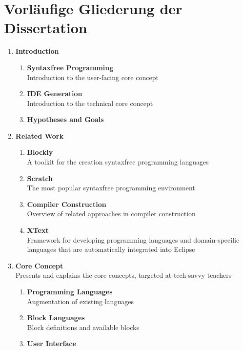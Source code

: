 \documentclass[paper=a4,fontsize=11pt,parskip=half]{scrartcl}
\begin{document}
\newpage

\section{Vorläufige Gliederung der Dissertation}

\begin{enumerate}[noitemsep]
\item \textbf{Introduction}
  \begin{enumerate}[noitemsep]
  \item \textbf{Syntaxfree Programming} \\
    Introduction to the user-facing core concept
  \item \textbf{IDE Generation} \\
    Introduction to the technical core concept
  \item \textbf{Hypotheses and Goals}
  \end{enumerate}
\item \textbf{Related Work}
  \begin{enumerate}[noitemsep]
  \item \textbf{Blockly}\\
    A toolkit for the creation syntaxfree programming languages
  \item \textbf{Scratch}\\
    The most popular syntaxfree programming environment
  \item \textbf{Compiler Construction}\\
    Overview of related approaches in compiler construction
  \item \textbf{XText} \\
    Framework for developing programming languages and domain-specific languages that are automatically integrated into Eclipse
  \end{enumerate}
\item \textbf{Core Concept}\\
  Presents and explains the core concepts, targeted at tech-savvy teachers
  \begin{enumerate}
  \item \textbf{Programming Languages}\\
    Augmentation of existing languages
  \item \textbf{Block Languages}\\
    Block definitions and available blocks
  \item \textbf{User Interface}\\

\end{enumerate}
\end{enumerate}
\end{document}
